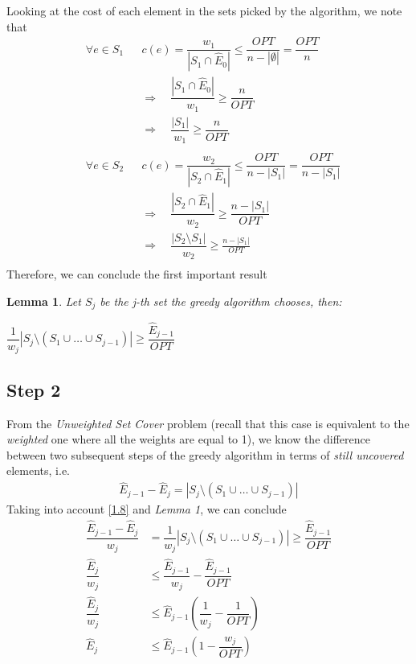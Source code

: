\documentclass[a4paper,11pt]{article}
\begin{document}
Looking at the cost of each element in the sets picked by the algorithm, we note that
\begin{align*}
&\forall e \in S_{1} & &c(e)=\dfrac{w_{1}}{\left| S_{1}\cap \hat{E}_0 \right|} \le \dfrac{OPT}{n-\left| \emptyset \right|} = \dfrac{OPT}{n}\\
& & &\Rightarrow \quad \dfrac{\left|S_{1}\cap \hat{E}_0\right|}{w_{1}} \ge \dfrac{n}{OPT}\\
& & &\Rightarrow \quad \dfrac{\left|S_{1}\right|}{w_{1}} \ge \dfrac{n}{OPT}\\\\
&\forall e \in S_{2} & &c(e)=\dfrac{w_{2}}{\left|S_{2}\cap \hat{E}_{1} \right|} \le \dfrac{OPT}{n-|S_{1}|} = \dfrac{OPT}{n-\left|S_{1}\right|}\\
& & &\Rightarrow \quad \dfrac{\left|S_{2} \cap \hat{E}_{1} \right|}{w_{2}} \ge \dfrac{n- \left|S_{1} \right|}{OPT}\\
& & &\Rightarrow \quad \dfrac{\left|S_{2} \setminus S_{1} \right|}{w_{2}} \ge \frac{n-|S_{1}|}{OPT}\\
\end{align*}
Therefore, we can conclude the first important result
\newtheorem{theorem}{Lemma}
\begin{theorem}
	Let $S_{j}$ be the j-th set the greedy algorithm chooses, then:
	\begin{center}
		$\dfrac{1}{w_{j}} \left| S_{j} \setminus (S_{1} \cup \dots \cup S_{j-1}) \right| \geq \dfrac{\hat{E}_{j-1}}{OPT} $
	\end{center}
\end{theorem}

\subsection{Step 2}
From the \textit{Unweighted Set Cover} problem (recall that this case is equivalent to the \textit{weighted} one where all the weights are equal to 1), we know the difference between two subsequent steps of the greedy algorithm in terms of \textit{still uncovered} elements, i.e.
\begin{align}
\hat{E}_{j-1}-\hat{E}_{j}=\left|S_{j} \setminus (S_{1} \cup \dots \cup S_{j-1}) \right| \label{1.8}
\end{align}
Taking into account \ref{1.8} and \textit{Lemma 1}, we can conclude
\begin{align}
\dfrac{\hat{E}_{j-1}-\hat{E}_{j}}{w_{j}} &= \dfrac{1}{w_{j}} \left| S_{j} \setminus (S_{1} \cup \dots \cup S_{j-1}) \right| \ge \dfrac{\hat{E}_{j-1}}{OPT} \nonumber\\
\dfrac{\hat{E}_{j}}{w_{j}} &\le \dfrac{\hat{E}_{j-1}}{w_{j}} - \dfrac{\hat{E}_{j-1}}{OPT} \nonumber \\
\dfrac{\hat{E}_{j}}{w_{j}} &\le \hat{E}_{j-1}\left( \dfrac{1}{w_{j}}-\dfrac{1}{OPT} \right) \nonumber\\
\hat{E}_{j} &\le \hat{E}_{j-1}\left( 1 -\dfrac{w_{j}}{OPT} \right) \label{1.9}
\end{align}
\end{document}
